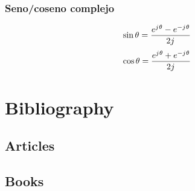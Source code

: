 \documentclass[
	12pt, %
	fleqn, %
	a4paper, %
	oneside, %
]{LegrandOrangeBook}
\begin{document}
\subsection{Seno/coseno complejo}
\begin{multicols}{2}
\begin{equation}
\sin\theta=\frac{e^{{j\mkern1mu}\theta}-e^{-{j\mkern1mu}\theta}}{2{j\mkern1mu}}
\end{equation}
\begin{equation}
\cos\theta=\frac{e^{{j\mkern1mu}\theta}+e^{-{j\mkern1mu}\theta}}{2{j\mkern1mu}}
\end{equation}
\end{multicols}
\stopcontents[part] %


\chapterspaceabove{6.75cm} %
\chapterspacebelow{7.25cm} %

\chapter*{Bibliography}

\section*{Articles}


\section*{Books}
\end{document}

